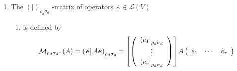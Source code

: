 \documentclass[aps,preprint]{revtex4}
\begin{document}
\begin{enumerate}
\item The $\left( \left. {}\right\vert \right) _{\rho _{d}\sigma _{d}}$%
-matrix of operators $A\in \mathcal{L}\left( V\right) $

\begin{enumerate}
\item is defined by 
\begin{equation}
\mathcal{M}_{\rho _{d}\sigma _{d}e}\left( A\right) =\left( \left. \overset{}{%
\boldsymbol{e}}\right\vert A\boldsymbol{e}\right) _{\rho _{d}\sigma _{d}}=%
\left[ \left( 
\begin{array}{c}
\left( e_{1}\right\vert _{\rho _{d}\sigma _{d}} \\ 
\vdots \\ 
\left( e_{r}\right\vert _{\rho _{d}\sigma _{d}}%
\end{array}%
\right) \right] A\left( 
\begin{array}{ccc}
e_{1} & \cdots & e_{r}%
\end{array}%
\right)
\end{equation}


\end{enumerate}
\end{enumerate}
\end{document}
